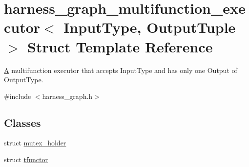 \hypertarget{structharness__graph__multifunction__executor}{}\section{harness\+\_\+graph\+\_\+multifunction\+\_\+executor$<$ Input\+Type, Output\+Tuple $>$ Struct Template Reference}
\label{structharness__graph__multifunction__executor}


\hyperlink{structA}{A} multifunction executor that accepts Input\+Type and has only one Output of Output\+Type.  




{\ttfamily \#include $<$harness\+\_\+graph.\+h$>$}

\subsection*{Classes}
\begin{DoxyCompactItemize}
\item 
struct \hyperlink{structharness__graph__multifunction__executor_1_1mutex__holder}{mutex\+\_\+holder}
\item 
struct \hyperlink{structharness__graph__multifunction__executor_1_1tfunctor}{tfunctor}
\end{DoxyCompactItemize}
